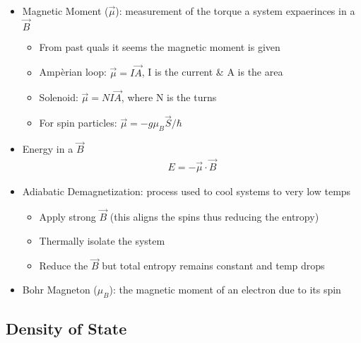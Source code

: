 \begin{itemize}
	\item Magnetic Moment ($\vec{\mu}$): measurement of the torque a system expaerinces in a $\vec{B}$
	      \begin{itemize}
		      \item From past quals it seems the magnetic moment is given
		      \item Ampèrian loop: $\vec{\mu} = I \vec{A}$, I is the current \& A is the area
		      \item Solenoid: $\vec{\mu} = N I \vec{A}$, where N is the turns
		      \item For spin particles: $\vec{\mu} = -g \mu_B \vec{S} / \hbar$
	      \end{itemize}
	\item Energy in a $\vec{B}$
	      \begin{align}
		      E = - \vec{\mu} \cdot \vec{B}
	      \end{align}
	\item Adiabatic Demagnetization: process used to cool systems to very low temps
	      \begin{itemize}
		      \item Apply strong $\vec{B}$ (this aligns the spins thus reducing the entropy)
		      \item Thermally isolate the system
		      \item Reduce the $\vec{B}$ but total entropy remains constant and temp drops
	      \end{itemize}
	\item Bohr Magneton ($\mu_B$): the magnetic moment of an electron due to its spin
\end{itemize}


\subsection{Density of State}
